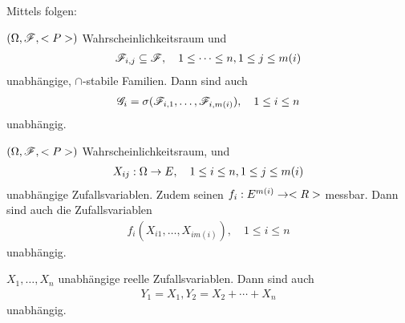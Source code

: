 Mittels  folgen:

\begin{conclusion}
	$(\Omega,\mathscr F,<P>)$ Wahrscheinlichkeitsraum und
	\begin{align*}
	\mathscr F_{i,j} \subseteq \mathscr F, \quad 1 \le \dots \le n, 1 \le j \le m(i)
	\end{align*}
	unabhängige, $\cap$-stabile Familien.
	Dann sind auch
	\begin{align*}
	\mathscr{G}_i = \sigma(\mathscr F_{i,1},\dots, \mathscr F_{i,m(i)}), \quad 1 \le i \le n
	\end{align*}
	unabhängig.
\end{conclusion}

\begin{conclusion}
	$(\Omega,\mathscr F,<P>)$ Wahrscheinlichkeitsraum, und
	\begin{align*}
	X_{ij}: \Omega \to E, \quad 1 \le i \le n, 1 \le j \le m(i)
	\end{align*}
	unabhängige Zufallsvariablen. Zudem seinen $f_i: E^{m(i)} \to <R>$ messbar. Dann sind auch die Zufallsvariablen
	\begin{align*}
	f_i(X_{i1}, \dots, X_{im(i)}), \quad 1 \le i \le n
	\end{align*}
	unabhängig.
\end{conclusion}

\begin{example}
	$X_1, \dots, X_n$ unabhängige reelle Zufallsvariablen. Dann sind auch
	\begin{align*}
	Y_1 = X_1, Y_2 = X_2 + \cdots + X_n
	\end{align*}
	unabhängig.
\end{example}